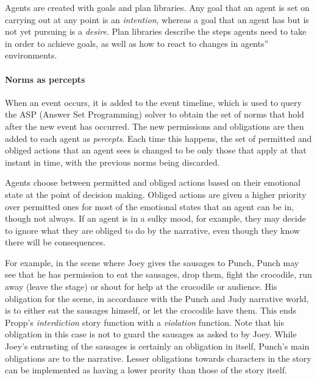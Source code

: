 \documentclass[11pt]{report}
\begin{document}
Agents are created with goals and plan libraries. Any goal that an agent is set on carrying out at any point is an \emph{intention}, whereas a goal that an agent has but is not yet pursuing is a \emph{desire}. Plan libraries describe the steps agents need to take in order to achieve goals, as well as how to react to changes in agents'' environments.

\paragraph{Norms as percepts}\label{sec:norms-as-percepts}
When an event occurs, it is added to the event timeline, which is used to query the ASP (Answer Set Programming) solver to obtain the set of norms that hold after the new event has occurred. The new permissions and obligations are then added to each agent as \emph{percepts}. Each time this happens, the set of permitted and obliged actions that an agent sees is changed to be only those that apply at that instant in time, with the previous norms being discarded.

Agents choose between permitted and obliged actions based on their emotional state at the point of decision making. Obliged actions are given a higher priority over permitted ones for most of the emotional states that an agent can be in, though not always. If an agent is in a sulky mood, for example, they may decide to ignore what they are obliged to do by the narrative, even though they know there will be consequences.

For example, in the scene where Joey gives the sausages to Punch, Punch may see that he has permission to eat the sausages, drop them, fight the crocodile, run away (leave the stage) or shout for help at the crocodile or audience. His obligation for the scene, in accordance with the Punch and Judy narrative world, is to either eat the sausages himself, or let the crocodile have them. This ends Propp's \emph{interdiction\/} story function with a \emph{violation\/} function. Note that his obligation in this case is not to guard the sausages as asked to by Joey. While Joey's entrusting of the sausages is certainly an obligation in itself, Punch's main obligations are to the narrative. Lesser obligations towards characters in the story can be implemented as having a lower prority than those of the story itself.
\end{document}
